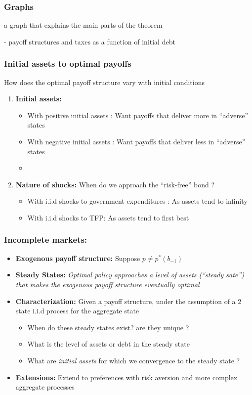 \documentclass{beamer}
\begin{document}
  \begin{frame}
   \frametitle{Graphs }
    a graph that explains the main parts of the theorem
   
   - payoff structures and taxes as a function of initial debt
  \end{frame}
  
  \begin{frame}
   \frametitle{Initial assets to optimal payoffs}
How does the optimal payoff structure vary with initial conditions
\begin{enumerate}
\item \textbf{Initial assets: }
\begin{itemize}
 
 \item With positive initial assets : Want payoffs that deliver more in ``adverse'' states 
 \item With negative initial assets : Want payoffs that deliver less in ``adverse'' states 
 \item 
\end{itemize}

 \item \textbf{Nature of shocks: } When do we approach the ``risk-free'' bond ?
 \begin{itemize}
  \item With i.i.d shocks to government expenditures : As assets tend to infinity
  \item With i.i.d  shocks to  TFP: As  assets tend to first best
 \end{itemize}

\end{enumerate}


   
  \end{frame}


\begin{frame}
	\frametitle{Incomplete markets:}
	\begin{itemize}
		\item  \textbf{Exogenous payoff structure:} Suppose $p\neq p^*(b_{-1})$
		\item \textbf{Steady States: }\emph{ Optimal policy approaches a level of assets (``steady
		sate'') that makes the exogenous payoff structure eventually optimal}
		
		\item \textbf{Characterization: } Given a payoff structure, under the assumption of a 2 state i.i.d process for the aggregate state 
		\begin{itemize}
			\item When do these steady states exist? are they unique ?
			\item What is the level of assets or debt in the steady state
			\item What are \emph{initial assets} for which we convergence to the steady state ?
 			\end{itemize}
		\item  \textbf{Extensions: } Extend to preferences with risk aversion and more complex aggregate processes
	\end{itemize}
\end{frame}  
  
\end{document}
